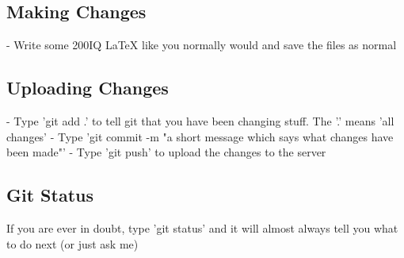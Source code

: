 \documentclass{article}
\begin{document}
\subsection{Making Changes}
- Write some 200IQ LaTeX like you normally would and save the files as normal

\subsection{Uploading Changes}
- Type 'git add .' to tell git that you have been changing stuff. The '.' means 'all changes'\newline\newline
- Type 'git commit -m "a short message which says what changes have been made"' \newline\newline
- Type 'git push' to upload the changes to the server

\subsection{Git Status}
If you are ever in doubt, type 'git status' and it will almost always tell you what to do next (or just ask me)
\end{document}
